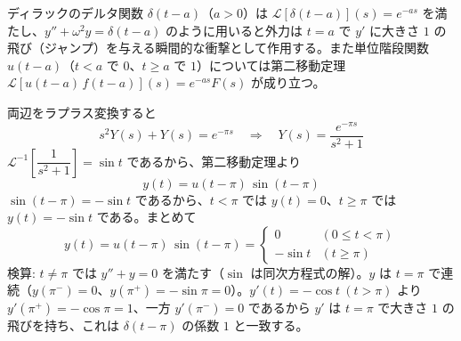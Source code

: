 
ディラックのデルタ関数 $\delta(t-a)$（$a>0$）は $\mathcal{L}[\delta(t-a)](s) = e^{-as}$ を満たし、$y'' + \omega^{2} y = \delta(t-a)$ のように用いると外力は $t=a$ で $y'$ に大きさ $1$ の飛び（ジャンプ）を与える瞬間的な衝撃として作用する。また単位階段関数 $u(t-a)$（$t<a$ で $0$、$t \ge a$ で $1$）については第二移動定理 $\mathcal{L}[u(t-a)\,f(t-a)](s) = e^{-as} F(s)$ が成り立つ。

両辺をラプラス変換すると
\[
s^{2}Y(s) + Y(s) = e^{-\pi s}
\quad\Longrightarrow\quad
Y(s) = \frac{e^{-\pi s}}{s^{2}+1}
\]
$\mathcal{L}^{-1}\!\left[\dfrac{1}{s^{2}+1}\right] = \sin t$ であるから、第二移動定理より
\[
y(t) = u(t-\pi)\,\sin(t-\pi)
\]
$\sin(t-\pi) = -\sin t$ であるから、$t<\pi$ では $y(t)=0$、$t \ge \pi$ では $y(t) = -\sin t$ である。まとめて
\[
\boxed{\; y(t) = u(t-\pi)\,\sin(t-\pi) =
\begin{cases}
0 & (0 \le t < \pi) \\
-\sin t & (t \ge \pi)
\end{cases} \;}
\]
検算: $t \ne \pi$ では $y''+y=0$ を満たす（$\sin$ は同次方程式の解）。$y$ は $t=\pi$ で連続（$y(\pi^{-})=0$、$y(\pi^{+})=-\sin\pi=0$）。$y'(t) = -\cos t\ (t>\pi)$ より $y'(\pi^{+})=-\cos\pi=1$、一方 $y'(\pi^{-})=0$ であるから $y'$ は $t=\pi$ で大きさ $1$ の飛びを持ち、これは $\delta(t-\pi)$ の係数 $1$ と一致する。
